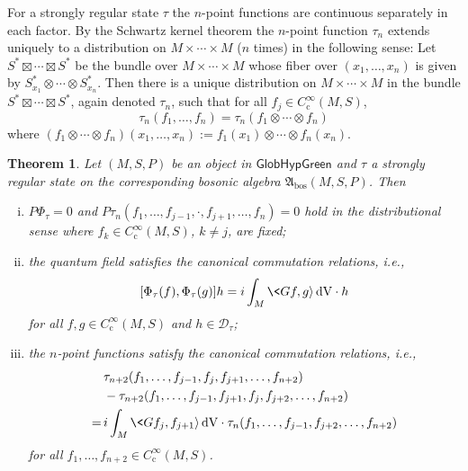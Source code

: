 \documentclass[a4paper,11pt]{amsart}
\newtheorem{thm}{Theorem}[section]
\theoremstyle{definition}
\begin{document}
For a strongly regular state $\tau$ the $n$-point functions are continuous separately in each factor.
By the Schwartz kernel theorem \cite[Thm.~5.2.1]{Hoerm1} the $n$-point function $\tau_n$ extends uniquely to a distribution on $M\times\cdots\times M$ ($n$ times) in the following sense:
Let $S^*\boxtimes \cdots \boxtimes S^*$ be the bundle over $M\times\cdots\times M$ whose fiber over $(x_1,\ldots,x_n)$ is given by $S^*_{x_1}\otimes \cdots \otimes S^*_{x_n}$.
Then there is a unique distribution on $M\times\cdots\times M$ in the bundle $S^*\boxtimes \cdots \boxtimes S^*$, again denoted $\tau_n$, such that for all $f_j\in{C^\infty_\mathrm{c}}(M,S)$,
$$
\tau_n(f_1,\ldots,f_n) = \tau_n(f_1\otimes \cdots  \otimes f_n)
$$
where $(f_1\otimes \cdots  \otimes f_n)(x_1,\ldots,x_n) := f_1(x_1)\otimes\cdots\otimes f_n(x_n)$.

\begin{thm}\label{thm:QFbosonic}
Let $(M,S,P)$ be an object in ${\mathsf{GlobHypGreen}}$ and $\tau$ a strongly regular state on the corresponding bosonic algebra ${\mathfrak{A}_\mathrm{bos}}(M,S,P)$.
Then
\begin{enumerate}[(i)]
\item\label{bos:PPsiO}
$P\Phi_\tau=0$ and $P\tau_n(f_1,\ldots,f_{j-1},\cdot,f_{j+1},\ldots,f_n)=0$ hold in the distributional sense where $f_k\in{C^\infty_\mathrm{c}}(M,S)$, $k\neq j$, are fixed;
\item\label{bos:CCRPsi}
the quantum field satisfies the canonical commutation relations, i.e., 
$$
[\Phi_\tau(f),\Phi_\tau(g)]h = i\int_M \<Gf,g{\rangle}{\,\mathrm{dV}} \cdot h
$$ 
for all $f,g\in{C^\infty_\mathrm{c}}(M,S)$ and $h\in{\mathcal{D}}_\tau$;
\item\label{bos:CCRnpoint}
the $n$-point functions satisfy the canonical commutation relations, i.e., \begin{align*}
&\tau_{n+2}(f_1,\ldots,f_{j-1},f_j,f_{j+1},\ldots,f_{n+2})\\
& - \tau_{n+2}(f_1,\ldots,f_{j-1},f_{j+1},f_j,f_{j+2},\ldots,f_{n+2}) \\
=\,& i\int_M\<Gf_j,f_{j+1}{\rangle}{\,\mathrm{dV}} \cdot \tau_n(f_1,\ldots,f_{j-1},f_{j+2},\ldots,f_{n+2})
\end{align*}
for all $f_1,\ldots,f_{n+2}\in {C^\infty_\mathrm{c}}(M,S)$.
\end{enumerate}
\end{thm}
\end{document}
